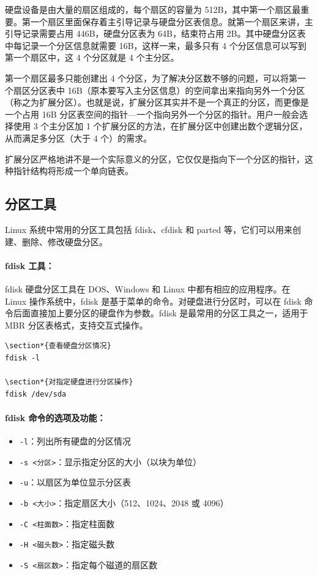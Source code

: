 \documentclass[12pt,UTF8]{ctexbook}
\begin{document}
硬盘设备是由大量的扇区组成的，每个扇区的容量为 512B，其中第一个扇区最重要。第一个扇区里面保存着主引导记录与硬盘分区表信息。就第一个扇区来讲，主引导记录需要占用 446B，硬盘分区表为 64B，结束符占用 2B。其中硬盘分区表中每记录一个分区信息就需要 16B，这样一来，最多只有 4 个分区信息可以写到第一个扇区中，这 4 个分区就是 4 个主分区。

第一个扇区最多只能创建出 4 个分区，为了解决分区数不够的问题，可以将第一个扇区分区表中 16B（原本要写入主分区信息）的空间拿出来指向另外一个分区（称之为扩展分区）。也就是说，扩展分区其实并不是一个真正的分区，而更像是一个占用 16B 分区表空间的指针—一个指向另外一个分区的指针。用户一般会选择使用 3 个主分区加 1 个扩展分区的方法，在扩展分区中创建出数个逻辑分区，从而满足多分区（大于 4 个）的需求。

扩展分区严格地讲不是一个实际意义的分区，它仅仅是指向下一个分区的指针，这种指针结构将形成一个单向链表。

\subsection{分区工具}
Linux 系统中常用的分区工具包括 fdisk、cfdisk 和 parted 等，它们可以用来创建、删除、修改硬盘分区。

\paragraph{fdisk 工具：}
fdisk 硬盘分区工具在 DOS、Windows 和 Linux 中都有相应的应用程序。在 Linux 操作系统中，fdisk 是基于菜单的命令。对硬盘进行分区时，可以在 fdisk 命令后面直接加上要分区的硬盘作为参数。fdisk 是最常用的分区工具之一，适用于 MBR 分区表格式，支持交互式操作。
\begin{verbatim}
\section*{查看硬盘分区情况}
fdisk -l

\section*{对指定硬盘进行分区操作}
fdisk /dev/sda
\end{verbatim}

\paragraph{fdisk 命令的选项及功能：}
\begin{itemize}
    \item \verb+-l+：列出所有硬盘的分区情况
    \item \verb+-s <分区>+：显示指定分区的大小（以块为单位）
    \item \verb+-u+：以扇区为单位显示分区表
    \item \verb+-b <大小>+：指定扇区大小（512、1024、2048 或 4096）
    \item \verb+-C <柱面数>+：指定柱面数
    \item \verb+-H <磁头数>+：指定磁头数
    \item \verb+-S <扇区数>+：指定每个磁道的扇区数
\end{itemize}
\end{document}
